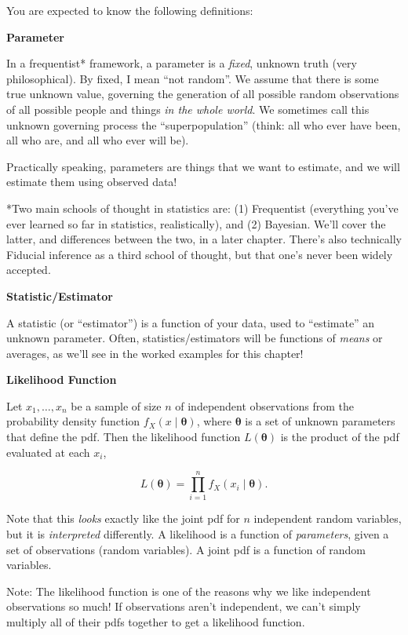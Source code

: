 \documentclass[
  letterpaper,
  DIV=11,
  numbers=noendperiod]{scrreprt}
\begin{document}
You are expected to know the following definitions:

\textbf{Parameter}

In a frequentist* framework, a parameter is a \emph{fixed}, unknown
truth (very philosophical). By fixed, I mean ``not random''. We assume
that there is some true unknown value, governing the generation of all
possible random observations of all possible people and things \emph{in
the whole world}. We sometimes call this unknown governing process the
``superpopulation'' (think: all who ever have been, all who are, and all
who ever will be).

Practically speaking, parameters are things that we want to estimate,
and we will estimate them using observed data!

*Two main schools of thought in statistics are: (1) Frequentist
(everything you've ever learned so far in statistics, realistically),
and (2) Bayesian. We'll cover the latter, and differences between the
two, in a later chapter. There's also technically Fiducial inference as
a third school of thought, but that one's never been widely accepted.

\textbf{Statistic/Estimator}

A statistic (or ``estimator'') is a function of your data, used to
``estimate'' an unknown parameter. Often, statistics/estimators will be
functions of \emph{means} or averages, as we'll see in the worked
examples for this chapter!

\textbf{Likelihood Function}

Let \(x_1, \dots, x_n\) be a sample of size \(n\) of independent
observations from the probability density function
\(f_X(x \mid \boldsymbol{\theta})\), where \(\boldsymbol{\theta}\) is a
set of unknown parameters that define the pdf. Then the likelihood
function \(L(\boldsymbol{\theta})\) is the product of the pdf evaluated
at each \(x_i\),

\[
L(\boldsymbol{\theta}) = \prod_{i = 1}^n f_X(x_i \mid \boldsymbol{\theta}).
\]

Note that this \emph{looks} exactly like the joint pdf for \(n\)
independent random variables, but it is \emph{interpreted} differently.
A likelihood is a function of \emph{parameters}, given a set of
observations (random variables). A joint pdf is a function of random
variables.

Note: The likelihood function is one of the reasons why we like
independent observations so much! If observations aren't independent, we
can't simply multiply all of their pdfs together to get a likelihood
function.
\end{document}
